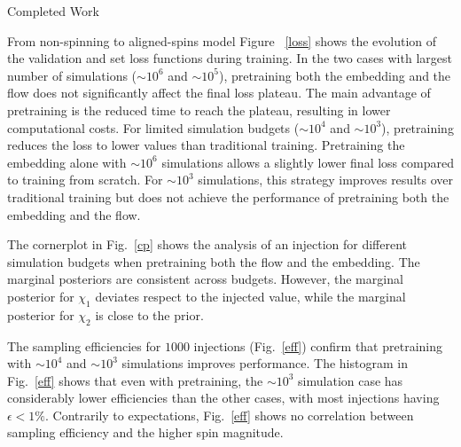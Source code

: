 \documentclass[a4paper, 12pt, twoside, openright, titlepage]{book}
\begin{document}
\begin{chapter}{Completed Work}
\begin{section}{From non-spinning to aligned-spins model}
Figure ~\ref{loss} shows the evolution of the validation and set loss functions during training.
In the two cases with largest number of simulations ($\sim 10^{6}$ and $\sim 10^{5}$), pretraining both the embedding and the flow does not significantly affect the final loss plateau. The main advantage of pretraining is the reduced time to reach the plateau, resulting in lower computational costs.
For limited simulation budgets ($\sim 10^{4}$ and $\sim 10^{3}$), pretraining reduces the loss to lower values than traditional training.
Pretraining the embedding alone with $\sim10^{6}$ simulations allows a slightly lower final loss compared to training from scratch.
For $\sim10^{3}$ simulations, this strategy improves results over traditional training but does not achieve the performance of pretraining both the embedding and the flow.

The cornerplot in Fig.~\ref{cp} shows the analysis of an injection for different simulation budgets when pretraining both the flow and the embedding. 
The marginal posteriors are consistent across budgets. However, the marginal posterior for $\chi_{1}$ deviates respect to the injected value, while the marginal posterior for $\chi_{2}$ is close to the prior. 

The sampling efficiencies for $1000$ injections (Fig.~\ref{eff}) confirm that pretraining with $\sim10^{4}$ and  $\sim10^{3}$ simulations improves performance. 
The histogram in Fig.~\ref{eff} shows that even with pretraining, the $\sim10^{3}$ simulation case has considerably lower efficiencies than the other cases, with most injections having $\epsilon<1\%$.
Contrarily to expectations, Fig.~\ref{eff} shows no correlation between sampling efficiency and the higher spin magnitude.










\end{section}
\end{chapter}
\end{document}
